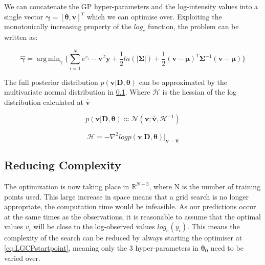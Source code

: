 \documentclass[a4paper,11pt]{report}
\DeclareMathOperator*{\argmin}{arg\,min}
\begin{document}
\doublespacing 

We can concatenate the GP hyper-parameters and the log-intensity values into a single vector \( \boldsymbol{\gamma} = [\boldsymbol{\theta}, \mathbf{v}]^{T}\) which we can optimise over. Exploiting the monotonically increasing property of the \(log_e\) function, the problem can be written as:

\begin{equation} \label{eq:GPfmin}
\hat{\boldsymbol{\gamma}} = \argmin_\gamma{\{ \sum_{i=1}^{N}e^{v_i} - \mathbf{v}^{T}\mathbf{y} + \frac{1}{2}ln(|\boldsymbol{\Sigma}|) + \frac{1}{2}(\mathbf{v}-\boldsymbol{\mu})^{T}\boldsymbol{\Sigma}^{-1}(\mathbf{v}-\boldsymbol{\mu})\}}
\end{equation}

The full posterior distribution \(p(\mathbf{v|D},\boldsymbol{\theta})\) can be approximated by the multivariate normal distribution in \ref{}. Where \(\boldsymbol{\mathcal{H}}\) is the hessian of the log distribution calculated at \(\hat{\mathbf{v}}\) 

\singlespacing
\begin{equation}
p(\mathbf{v|D},\boldsymbol{\theta}) \approx \mathcal{N} (\mathbf{v}; \hat{\mathbf{v}}, \boldsymbol{\mathcal{H}}^{-1})
\end{equation}

\begin{equation}
\boldsymbol{\mathcal{H}} = -\nabla^2 log p(\mathbf{v|D},\boldsymbol{\theta}) |_{\mathbf{v}=\hat{\mathbf{v}}}
\end{equation}
\doublespacing

\subsection{Reducing Complexity}

The optimization is now taking place in \(\mathds{R}^{N+3}\), where N is the number of training points used. This large increase in space means that a grid search is no longer appropriate, the computation time would be infeasible. As our predictions occur at the same times as the observations, it is reasonable to assume that the optimal values \(v_i\) will be close to the log-observed values \(log_e(y_i)\). This means the complexity of the search can be reduced by always starting the optimiser at \ref{eq:LGCPstartpoint}, meaning only the 3 hyper-parameters in \(\boldsymbol{\theta_0}\) need to be varied over. \par
\end{document}

